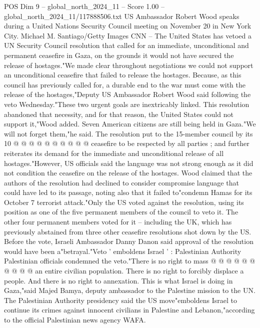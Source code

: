 \begin{textsample}{POS Dim 9 – global\_north\_2024\_11 – Score 1.00 – global\_north\_2024\_11/117888506.txt}  \label{ex:f9_pos_408}
US Ambassador Robert Wood speaks during a United Nations Security Council meeting on November 20 in New York City.
Michael M.
Santiago/Getty Images CNN -- The United States has vetoed a UN Security Council resolution that called for an immediate, unconditional and permanent ceasefire in Gaza, on the grounds it would not have secured the release of hostages."We made clear throughout negotiations we could not support an unconditional ceasefire that failed to release the hostages.
Because, as this council has previously called for, a durable end to the war must come with the release of the hostages,"Deputy US Ambassador Robert Wood said following the veto Wednesday."These two urgent goals are inextricably linked.
This resolution abandoned that necessity, and for that reason, the United States could not support it,"Wood added.
Seven American citizens are still being held in Gaza."We will not forget them,"he said.
The resolution put to the 15-member council by its 10 @ @ @ @ @ @ @ @ @ @ ceasefire to be respected by all parties ; and further reiterates its demand for the immediate and unconditional release of all hostages."However, US officials said the language was not strong enough as it did not condition the ceasefire on the release of the hostages.
Wood claimed that the authors of the resolution had declined to consider compromise language that could have led to its passage, noting also that it failed to"condemn Hamas for its October 7 terrorist attack."Only the US voted against the resolution, using its position as one of the five permanent members of the council to veto it.
The other four permanent members voted for it -- including the UK, which has previously abstained from three other ceasefire resolutions shot down by the US.
Before the vote, Israeli Ambassador Danny Danon said approval of the resolution would have been a"betrayal."Veto ' emboldens Israel ' : Palestinian Authority Palestinian officials condemned the veto."There is no right to mass @ @ @ @ @ @ @ @ @ @ an entire civilian population.
There is no right to forcibly displace a people.
And there is no right to annexation.
This is what Israel is doing in Gaza,"said Majed Bamya, deputy ambassador to the Palestine mission to the UN.
The Palestinian Authority presidency said the US move"emboldens Israel to continue its crimes against innocent civilians in Palestine and Lebanon,"according to the official Palestinian news agency WAFA.

\end{textsample}
